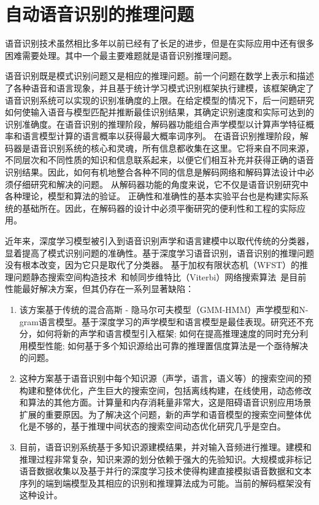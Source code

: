 \section{自动语音识别的推理问题}
\label{chap:intro0-inf}

语音识别技术虽然相比多年以前已经有了长足的进步，但是在实际应用中还有很多困难需要处理。其中一个最主要难题就是语音识别推理问题。

语音识别既是模式识别问题又是相应的推理问题。前一个问题在数学上表示和描述了各种语音和语言现象，并且基于统计学习模式识别框架执行建模，该框架确定了语音识别系统可以实现的识别准确度的上限。在给定模型的情况下，后一问题研究如何使输入语音与模型匹配并推断最佳识别结果，其确定识别速度和实际可达到的识别准确度。在语音识别的推理阶段，解码器功能组合声学模型以计算声学特征概率和语言模型计算的语言概率以获得最大概率词序列。
在语音识别推理阶段，解码器是语音识别系统的核心和灵魂，所有信息都收集在这里。它将来自不同来源，不同层次和不同性质的知识和信息联系起来，以便它们相互补充并获得正确的语音识别结果。因此，如何有机地整合各种不同的信息是解码网络和解码算法设计中必须仔细研究和解决的问题。
从解码器功能的角度来说，它不仅是语音识别研究中各种理论，模型和算法的验证。
正确性和准确性的基本实验平台也是构建实际系统的基础所在。因此，在解码器的设计中必须平衡研究的便利性和工程的实际应用。


近年来，深度学习模型被引入到语音识别声学和语言建模中以取代传统的分类器，显着提高了模式识别问题的准确性。基于深度学习语音识别，语音识别的推理问题没有根本改变，因为它只是取代了分类器。
基于加权有限状态机（WFST）的推理问题静态搜索空间构造技术~\cite{mohri2002weighted}和帧同步维特比（Viterbi）网络搜索算法~\cite{forney1973viterbi}是目前性能最好解决方案，但其仍存在一系列显著缺陷：
\begin{enumerate}
\item 该方案基于传统的混合高斯 - 隐马尔可夫模型（GMM-HMM）声学模型和N-gram语言模型。基于深度学习的声学模型和语言模型是最佳表现。研究还不充分，如何将新的声学和语言模型引入框架; 如何在提高推理速度的同时充分利用模型性能; 如何基于多个知识源给出可靠的推理置信度算法是一个亟待解决的问题。
\item 这种方案基于语音识别中每个知识源（声学，语言，语义等）的搜索空间的预构建和整体优化，产生巨大的搜索空间，包括离线构建，在线使用，动态修改和算法的其他方面。计算量和内存消耗量非常大，这是阻碍语音识别应用场景扩展的重要原因。为了解决这个问题，新的声学和语音模型的搜索空间整体优化是不够的，基于推理中间状态的搜索空间动态优化研究几乎是空白。
\item 目前，语音识别系统基于多知识源建模结果，并对输入音频进行推理。建模和推理过程非常复杂，知识来源的划分依赖于强大的先验知识。大规模或非标记语音数据收集以及基于并行的深度学习技术使得构建直接模拟语音数据和文本序列的端到端模型及其相应的识别和推理算法成为可能。当前的解码框架没有这种设计。
\end{enumerate}


